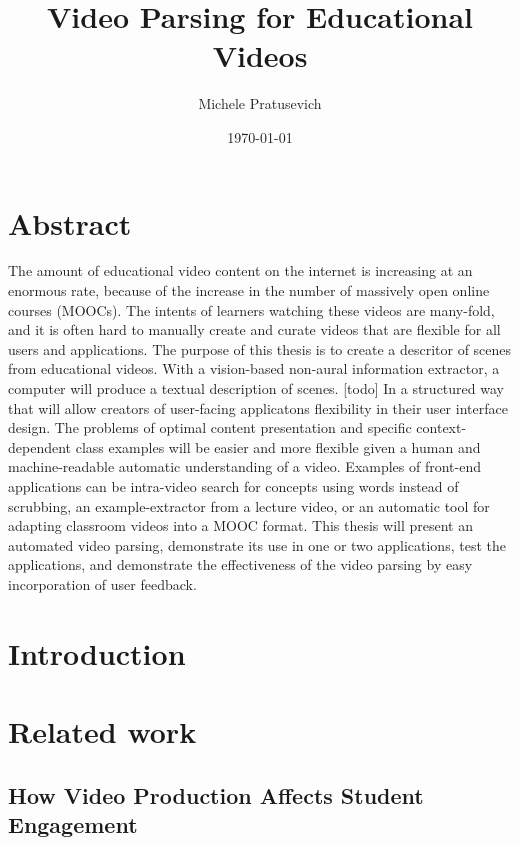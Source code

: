 \documentclass[12pt]{article}
\begin{document}
\title{Video Parsing for Educational Videos}
\author{Michele Pratusevich}
\date{\today}
\maketitle

\section{Abstract}

The amount of educational video content on the internet is increasing at an enormous rate, because of the increase in the number of massively open online courses (MOOCs). The intents of learners watching these videos are many-fold, and it is often hard to manually create and curate videos that are flexible for all users and applications. The purpose of this thesis is to create a descritor of scenes from educational videos. With a vision-based non-aural information extractor, a computer will produce a textual description of scenes. [todo] In a structured way that will allow creators of user-facing applicatons flexibility in their user interface design. The problems of optimal content presentation and specific context-dependent class examples will be easier and more flexible given a human and machine-readable automatic understanding of a video. Examples of front-end applications can be intra-video search for concepts using words instead of scrubbing, an example-extractor from a lecture video, or an automatic tool for adapting classroom videos into a MOOC format. This thesis will present an automated video parsing, demonstrate its use in one or two applications, test the applications, and demonstrate the effectiveness of the video parsing by easy incorporation of user feedback.

\section{Introduction}
\section{Related work}

\subsection{How Video Production Affects Student Engagement}
\end{document}

